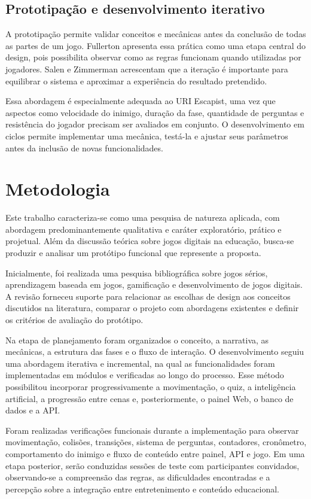 \documentclass[12pt]{article}
\begin{document}
\subsection{Prototipação e desenvolvimento iterativo}

A prototipação permite validar conceitos e mecânicas antes da conclusão de todas as partes de um jogo. Fullerton \cite{fullerton2018} apresenta essa prática como uma etapa central do design, pois possibilita observar como as regras funcionam quando utilizadas por jogadores. Salen e Zimmerman \cite{salen2004} acrescentam que a iteração é importante para equilibrar o sistema e aproximar a experiência do resultado pretendido.

Essa abordagem é especialmente adequada ao URI Escapist, uma vez que aspectos como velocidade do inimigo, duração da fase, quantidade de perguntas e resistência do jogador precisam ser avaliados em conjunto. O desenvolvimento em ciclos permite implementar uma mecânica, testá-la e ajustar seus parâmetros antes da inclusão de novas funcionalidades.

\section{Metodologia}

Este trabalho caracteriza-se como uma pesquisa de natureza aplicada, com abordagem predominantemente qualitativa e caráter exploratório, prático e projetual. Além da discussão teórica sobre jogos digitais na educação, busca-se produzir e analisar um protótipo funcional que represente a proposta.

Inicialmente, foi realizada uma pesquisa bibliográfica sobre jogos sérios, aprendizagem baseada em jogos, gamificação e desenvolvimento de jogos digitais. A revisão forneceu suporte para relacionar as escolhas de design aos conceitos discutidos na literatura, comparar o projeto com abordagens existentes e definir os critérios de avaliação do protótipo.

Na etapa de planejamento foram organizados o conceito, a narrativa, as mecânicas, a estrutura das fases e o fluxo de interação. O desenvolvimento seguiu uma abordagem iterativa e incremental, na qual as funcionalidades foram implementadas em módulos e verificadas ao longo do processo. Esse método possibilitou incorporar progressivamente a movimentação, o quiz, a inteligência artificial, a progressão entre cenas e, posteriormente, o painel Web, o banco de dados e a API.

Foram realizadas verificações funcionais durante a implementação para observar movimentação, colisões, transições, sistema de perguntas, contadores, cronômetro, comportamento do inimigo e fluxo de conteúdo entre painel, API e jogo. Em uma etapa posterior, serão conduzidas sessões de teste com participantes convidados, observando-se a compreensão das regras, as dificuldades encontradas e a percepção sobre a integração entre entretenimento e conteúdo educacional.
\end{document}
